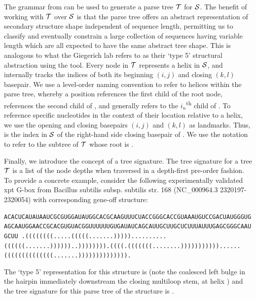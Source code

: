 The grammar from  can be used to generate a parse tree ${\mathcal T}$ for ${\mathcal S}$. The benefit of working with ${\mathcal T}$ over ${\mathcal S}$ is that the parse tree offers an abstract representation of secondary structure shape independent of sequence length, permitting us to classify and eventually constrain a large collection of sequences having variable length which are all expected to have the same abstract tree shape. This is analogous to what the Giegerich lab refers to as their `type 5' structural abstraction using the \rshapes tool. Every node in ${\mathcal T}$ represents a helix in ${\mathcal S}$, and internally tracks the indices of both its beginning $(i,j)$ and closing $(k,l)$ basepair. We use a level-order naming convention to refer to helices within the parse tree, whereby a position  references the first child of the root node,  references the second child of , and generally  refers to the $i_n$\textsuperscript{th} child of . To reference specific nucleotides in the context of their location relative to a helix, we use the opening and closing basepairs $(i,j)$ and $(k,l)$ as landmarks. Thus,  is the index in ${\mathcal S}$ of the right-hand side closing basepair of . We use the notation  to refer to the subtree of ${\mathcal T}$ whose root is .

Finally, we introduce the concept of a tree signature. The tree signature for a tree ${\mathcal T}$ is a list of the node depths when traversed in a depth-first pre-order fashion. To provide a concrete example, consider the following experimentally validated xpt G-box \rb from Bacillus subtilis subsp. subtilis str. 168 (NC\_000964.3 2320197-2320054) with corresponding gene-off structure:

\begin{center} \label{}
  \ssmall\tt ACACUCAUAUAAUCGCGUGGAUAUGGCACGCAAGUUUCUACCGGGCACCGUAAAUGUCCGACUAUGGGUGAGCAAUGGAACCGCACGUGUACGGUUUUUUGUGAUAUCAGCAUUGCUUGCUCUUUAUUUGAGCGGGCAAUGCUU
  \ssmall\tt .((((((((.....(((((.......)))))..........((((((.......))))))..)))))))).((((.(((((((........)))))))))))......((((((((((((((.......)))))))))))))).
\end{center}

The \rshapes `type 5' representation for this structure is \ms{[[][]][][]} (note the coalesced left bulge in the hairpin immediately downstream the closing multiloop stem, at helix ) and the tree signature for this parse tree of the structure is \ms{[0, 1, 2, 2, 1, 1]}.

